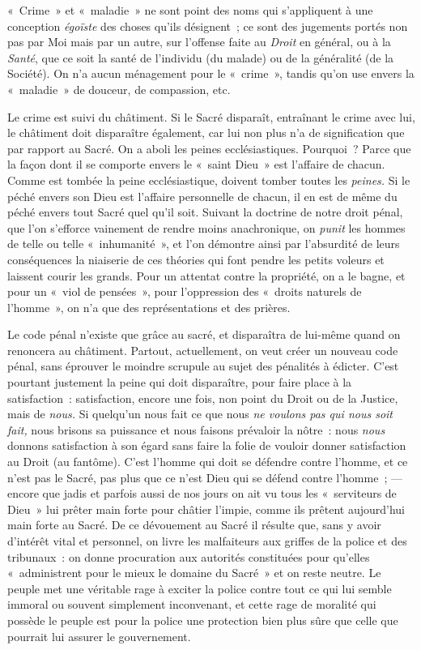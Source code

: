 \documentclass[french,twoside]{book} %
\begin{document}
« Crime » et « maladie » ne sont point des noms qui s’appliquent à une conception \emph{égoïste} des choses qu’ils désignent ; ce sont des jugements portés non pas par Moi mais par un autre, sur l’offense faite au \emph{Droit} en général, ou à la \emph{Santé}, que ce soit la santé de l’individu (du malade) ou de la généralité (de la Société). On n’a aucun ménagement pour le « crime », tandis qu’on use envers la « maladie » de douceur, de compassion, etc.\par
 Le crime est suivi du châtiment. Si le Sacré disparaît, entraînant le crime avec lui, le châtiment doit disparaître également, car lui non plus n’a de signification que par rapport au Sacré. On a aboli les peines ecclésiastiques. Pourquoi ? Parce que la façon dont il se comporte envers le « saint Dieu » est l’affaire de chacun. Comme est tombée la peine ecclésiastique, doivent tomber toutes les \emph{peines.} Si le péché envers son Dieu est l’affaire personnelle de chacun, il en est de même du péché envers tout Sacré quel qu’il soit. Suivant la doctrine de notre droit pénal, que l’on s’efforce vainement de rendre moins anachronique, on \emph{punit} les hommes de telle ou telle « inhumanité », et l’on démontre ainsi par l’absurdité de leurs conséquences la niaiserie de ces théories qui font pendre les petits voleurs et laissent courir les grands. Pour un attentat contre la propriété, on a le bagne, et pour un « viol de pensées », pour l’oppression des « droits naturels de l’homme », on n’a que des représentations et des prières.\par
Le code pénal n’existe que grâce au sacré, et disparaîtra de lui-même quand on renoncera au châtiment. Partout, actuellement, on veut créer un nouveau code pénal, sans éprouver le moindre scrupule au sujet des pénalités à édicter. C’est pourtant justement la peine qui doit disparaître, pour faire place à la satisfaction : satisfaction, encore une fois, non point du Droit ou de la Justice, mais de \emph{nous.} Si quelqu’un nous fait ce que nous \emph{ne voulons pas qui nous soit fait,} nous brisons sa puissance et nous faisons prévaloir la nôtre : nous \emph{nous} donnons satisfaction à son égard sans faire la folie de vouloir donner satisfaction au Droit (au fantôme). C’est l’homme qui doit se défendre contre l’homme, et ce n’est pas le Sacré, pas plus que ce n’est Dieu qui se défend contre l’homme ; — encore que jadis et parfois aussi de nos jours on ait vu tous les « serviteurs de Dieu » lui prêter main forte pour châtier l’impie, comme ils prêtent aujourd’hui main  forte au Sacré. De ce dévouement au Sacré il résulte que, sans y avoir d’intérêt vital et personnel, on livre les malfaiteurs aux griffes de la police et des tribunaux : on donne procuration aux autorités constituées pour qu’elles « administrent pour le mieux le domaine du Sacré » et on reste neutre. Le peuple met une véritable rage à exciter la police contre tout ce qui lui semble immoral ou souvent simplement inconvenant, et cette rage de moralité qui possède le peuple est pour la police une protection bien plus sûre que celle que pourrait lui assurer le gouvernement.\par
\end{document}
